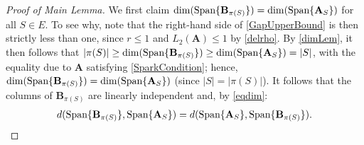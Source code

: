 \documentclass[9pt,twocolumn]{pnas-new}
\begin{document}
\begin{proof}[Proof of Main Lemma]
We first claim $\dim(\text{\rm Span}\{\mathbf{B}_{\pi(S)}\}) = \dim(\text{\rm Span}\{\mathbf{A}_{S}\})$ for all $S \in E$. To see why, note that the right-hand side of \eqref{GapUpperBound} is then strictly less than one, since $r \leq 1$ and $L_2(\mathbf{A}) \leq 1$ by \eqref{delrho}. By \eqref{dimLem}, it then follows that $|\pi(S)| \geq \dim(\text{\rm Span}\{\mathbf{B}_{\pi(S)}\}) \geq \dim(\text{\rm Span}\{\mathbf{A}_{S}\}) = |S|$, with the equality due to $\mathbf{A}$ satisfying \eqref{SparkCondition}; hence, $\dim(\text{\rm Span}\{\mathbf{B}_{\pi(S)}\}) = \dim(\text{\rm Span}\{\mathbf{A}_{S}\})$ (since $|S| = |\pi(S)|$). It follows that the columns of $\mathbf{B}_{\pi(S)}$ are linearly independent and, by \eqref{eqdim}:%
\begin{align}\label{eq2}
d(\text{\rm Span}\{\mathbf{B}_{\pi(S)}\}, \text{\rm Span}\{\mathbf{A}_S\} ) = d(\text{\rm Span}\{\mathbf{A}_S\}, \text{\rm Span}\{\mathbf{B}_{\pi(S)}\}).
\end{align}


\end{proof}
\end{document}
